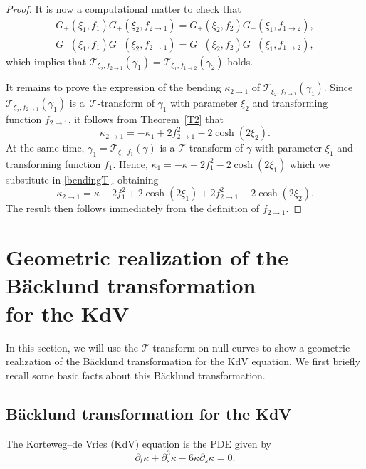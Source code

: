 \documentclass[10pt,a4paper]{amsart}
\numberwithin{equation}{section}
\def\bending{\kappa}
\begin{document}
\begin{proof}
	It is now a computational matter to check that
	\begin{gather*}
		G_+(\xi_1,f_1)G_+(\xi_2,f_{2\to 1})=G_+(\xi_2,f_2)G_+(\xi_1,f_{1\to 2}),\\
		G_-(\xi_1,f_1)G_-(\xi_2,f_{2\to 1})=G_-(\xi_2,f_2)G_-(\xi_1,f_{1\to 2}),
	\end{gather*}
	which implies that $\mathcal{T}_{\xi_2,f_{2\to 1}}(\gamma_1)=\mathcal{T}_{\xi_1,f_{1\to 2}}(\gamma_2)$ holds.
	
	It remains to prove the expression of the bending $\bending_{2\to 1}$ of $\mathcal{T}_{\xi_2,f_{2\to 1}}(\gamma_1)$. Since $\mathcal{T}_{\xi_2,f_{2\to 1}}(\gamma_1)$ is a~$\mathcal{T}$-transform of $\gamma_1$ with parameter $\xi_2$ and transforming function $f_{2\to 1}$, it follows from Theorem~\ref{T2} that
	\begin{equation}\label{bendingT}
		\bending_{2\to 1}=-\bending_1+2f_{2\to 1}^2-2\cosh(2\xi_2).
	\end{equation}
	At the same time, $\gamma_1=\mathcal{T}_{\xi_1,f_1}(\gamma)$ is a $\mathcal{T}$-transform of $\gamma$ with parameter $\xi_1$ and transforming function $f_1$. Hence, $\bending_1=-\bending+2f_1^2-2\cosh(2\xi_1)$ which we substitute in \eqref{bendingT}, obtaining
	\begin{equation*}\bending_{2\to 1}=\bending-2f_1^2+2\cosh(2\xi_1)+2f_{2\to 1}^2-2\cosh(2\xi_2).\end{equation*}
	The result then follows immediately from the definition of $f_{2\to 1}$.
\end{proof}

\section{Geometric realization of the B\"{a}cklund transformation \\ for the KdV}\label{section4}

In this section, we will use the $\mathcal{T}$-transform on null curves to show a geometric realization of the B\"{a}cklund transformation for the KdV equation. We first briefly recall some basic facts about this B\"{a}cklund transformation.

\subsection{B\"{a}cklund transformation for the KdV}\label{section4.1}

The Korteweg--de Vries (KdV) equation is the PDE given by
\begin{equation}\label{KdV2}
	\partial_t\bending+\partial_s^3\bending-6\bending \partial_s\bending=0.
\end{equation}
\end{document}
